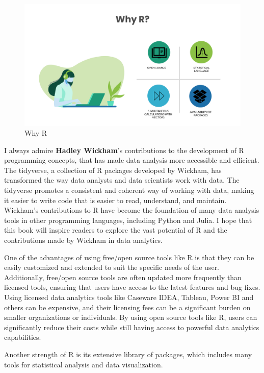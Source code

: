 \documentclass[
]{book}
\begin{document}
\begin{figure}

{\centering \includegraphics[width=0.9\linewidth]{images/whyR} 

}

\caption{Why R}\label{fig:whyr}
\end{figure}

I always admire \textbf{Hadley Wickham}'s contributions to the development of R programming concepts, that has made data analysis more accessible and efficient. The tidyverse, a collection of R packages developed by Wickham, has transformed the way data analysts and data scientists work with data. The tidyverse promotes a consistent and coherent way of working with data, making it easier to write code that is easier to read, understand, and maintain. Wickham's contributions to R have become the foundation of many data analysis tools in other programming languages, including Python and Julia. I hope that this book will inspire readers to explore the vast potential of R and the contributions made by Wickham in data analytics.

One of the advantages of using free/open source tools like R is that they can be easily customized and extended to suit the specific needs of the user. Additionally, free/open source tools are often updated more frequently than licensed tools, ensuring that users have access to the latest features and bug fixes. Using licensed data analytics tools like Caseware IDEA, Tableau, Power BI and others can be expensive, and their licensing fees can be a significant burden on smaller organizations or individuals. By using open source tools like R, users can significantly reduce their costs while still having access to powerful data analytics capabilities.

Another strength of R is its extensive library of packages, which includes many tools for statistical analysis and data visualization.
\end{document}
